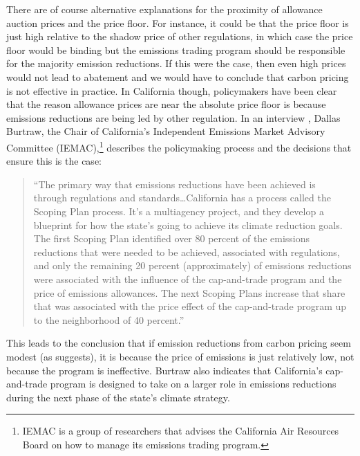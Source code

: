 There are of course alternative explanations for the proximity of allowance auction prices and the price floor. For instance, it could be that the price floor is just high relative to the shadow price of other regulations, in which case the price floor would be binding but the emissions trading program should be responsible for the majority emission reductions. If this were the case, then even high prices would not lead to abatement and we would have to conclude that carbon pricing is not effective in practice. In California though, policymakers have been clear that the reason allowance prices are near the absolute price floor is because emissions reductions are being led by other regulation. In an interview \citep{burtraw2022_rff}, Dallas Burtraw, the Chair of California's Independent Emissions Market Advisory Committee (IEMAC),\footnote{IEMAC is a group of researchers that advises the California Air Resources Board on how to manage its emissions trading program.} describes the policymaking process and the decisions that ensure this is the case:
\begin{quote}
	\singlespacing ``The primary way that emissions reductions have been achieved is \\through regulations and standards\ldots California has a process called the Scoping Plan process. It's a multiagency project, and they develop a blueprint for how the state's going to achieve its climate reduction goals. The first Scoping Plan identified over 80 percent of the emissions reductions that were needed to be achieved, associated with regulations, and only the remaining 20 percent (approximately) of emissions reductions were associated with the influence of the cap-and-trade program and the price of emissions allowances. The next Scoping Plans increase that share that was associated with the price effect of the cap-and-trade program up to the neighborhood of 40 percent.''
\end{quote}
This leads to the conclusion that if emission reductions from carbon pricing seem modest (as \cite{green2021does} suggests), it is because the price of emissions is just relatively low, not because the program is ineffective. Burtraw also indicates that California's cap-and-trade program is designed to take on a larger role in emissions reductions during the next phase of the state's climate strategy.

